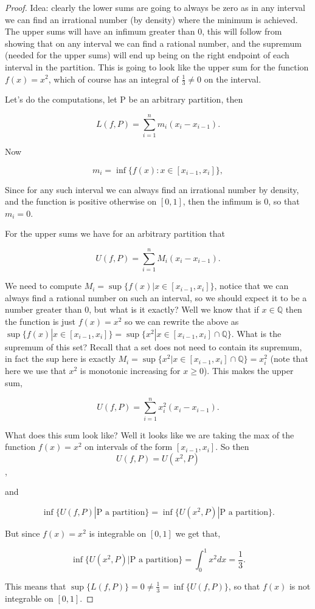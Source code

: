 \documentclass[11pt]{article}
\theoremstyle{plain}
\theoremstyle{remark}
\begin{document}
\begin{proof}
	Idea: clearly the lower sums are going to always be zero as in any interval we can find an irrational number (by density) where the minimum is achieved. The upper sums will have an infimum greater than 0, this will follow from showing that on any interval we can find a rational number, and the supremum (needed for the upper sums) will end up being on the right endpoint of each interval in the partition. This is going to look like the upper sum for the function $f(x)=x^2$, which of course has an integral of $\frac 1 3 \neq 0$ on the interval.
	
	Let's do the computations, let P be an arbitrary partition, then 
	
	\[
	L(f,P) = \sum_{i=1}^n m_i (x_i-x_{i-1}).
	\]
	
	Now 
	
	\[
	m_i = \inf \{f(x):x\in [x_{i-1},x_i]\},
	\]
	
	Since for any such interval we can always find an irrational number by density, and the function is positive otherwise on $[0,1]$, then the infimum is 0, so that $m_i=0$.
	
	For the upper sums we have for an arbitrary partition that
	
	\[
	U(f,P) = \sum_{i=1}^n M_i (x_i-x_{i-1}).
	\]
	
	We need to compute $M_{i}=\sup\{f(x)|x\in[x_{i-1},x_i]\}$, notice that we can always find a rational number on such an interval, so we should expect it to be a number greater than 0, but what is it exactly? Well we know that if $x\in \mathbb Q$ then the function is just $f(x)=x^2$ so we can rewrite the above as $\sup\{f(x)|x\in[x_{i-1},x_i]\}=\sup\{x^2|x\in[x_{i-1},x_i]\cap \mathbb Q\}$. What is the supremum of this set? Recall that a set does not need to contain its supremum, in fact the sup here is exactly $M_i=\sup\{x^2|x\in[x_{i-1},x_i]\cap \mathbb Q\}= x_i^2$ (note that here we use that $x^2$ is monotonic increasing for $x\geq 0$). This makes the upper sum,
	
	\[
	U(f,P) =\sum_{i=1}^n x^2_i(x_i-x_{i-1}).
	\]
	
	What does this sum look like? Well it looks like we are taking the max of the function $f(x)=x^2$ on intervals of the form $[x_{i-1},x_i]$. So then \[U(f,P)=U(x^2,P)\],
	
	and 
	
	\[\inf\{U(f,P)|\text{P a partition}\}=\inf \{U(x^2,P)|\text{P a partition}\}.\] 
	
	But since $f(x)=x^2$ is integrable on $[0,1]$ we get that,
	
	\[\inf \{U(x^2,P)|\text{P a partition}\}=\int_0^1 x^2 dx=\frac 1 3.\]
	
	This means that $\sup\{L(f,P)\}=0\neq \frac 1 3 =  \inf\{U(f,P)\}$, so that $f(x)$ is not integrable on $[0,1]$.
\end{proof}

	
\end{document}
